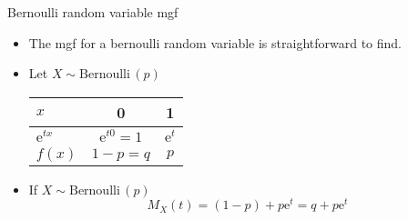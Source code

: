 \documentclass{article}
\newcommand{\follow}[1]{\sim \text{#1}\,}		%
\newcommand{\e}{\mathrm{e}}		%
\begin{document}
Bernoulli random variable mgf\bigskip
\begin{itemize}
    \item The mgf for a bernoulli random variable is straightforward to find.
    \item Let $X \follow{Bernoulli}(p)$\bigskip\\
    \begin{tabular}{| l || c | c |}
        \hline
        $x$ & 0 & 1\\
        \hline
        $\e^{tx}$ & $\e^{t0} = 1$ & $\e^{t}$\\
        \hline
        $f(x)$ & $1 - p = q$ & $p$\\
        \hline
    \end{tabular}\vspace{60pt}
    \item If $X \follow{Bernoulli}(p)$
    \[M_X(t) = (1 - p) + p\e^t = q + p\e^t\]
\end{itemize}\bigskip

\newpage%
\end{document}

